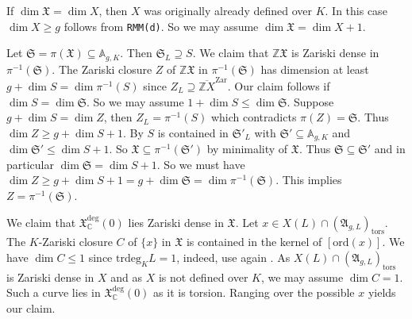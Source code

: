 \documentclass[12pt,oneside]{amsart}
\numberwithin{maincounter}{section}
\numberwithin{equation}{section}
\def\AA{\mathbb{A}}
\def\CC{\mathbb{C}}
\def\ZZ{\mathbb{Z}}
\newcommand{\cal}{\mathcal}
\newcommand{\cA}{\cal{A}}
\newcommand{\IC}{{\CC}}
\newcommand{\IZ}{{\ZZ}}
\newcommand{\IA}{{\AA}}
\renewcommand{\subset}{\subseteq} %
\renewcommand{\supset}{\supseteq}
\begin{document}
If $\dim \mathfrak X =\dim X$, then $X$ was originally already
defined over $K$. In this case $\dim X\ge g$ follows from \texttt{RMM(d)}.
So we may assume $\dim \mathfrak X = \dim X + 1$. 

Let $\mathfrak S = \pi(\mathfrak X)\subset\IA_{g,K}$.
Then $\mathfrak{S}_L\supset S$.
We claim that $\IZ \mathfrak X$ is Zariski dense in
$\pi^{-1}(\mathfrak S)$.
The Zariski closure $Z$ of $\IZ \mathfrak X$ in
$\pi^{-1}(\mathfrak S)$ %
has dimension at least
$g+\dim S = \dim \pi^{-1}(S)$ since $Z_L\supset \overline{\IZ
  X}^{\mathrm{Zar}}$.
Our claim follows if $\dim S =
\dim\mathfrak{S}$.  So we may assume $1+\dim S \le  \dim \mathfrak S$.
Suppose $g+\dim S = \dim Z$, then  $Z_L= \pi^{-1}(S)$
which contradicts $ \pi(Z)=\mathfrak{S}$.
 Thus $\dim Z\ge g + \dim S + 1$.
By \cite[Lemma~2.2]{BarDill} $S$ is contained in $\mathfrak{S}'_L$
with $\mathfrak{S}'\subset\IA_{g,K}$ and $\dim \mathfrak{S}' \le \dim
S + 1$. So $\mathfrak{X} \subset\pi^{-1}(\mathfrak S')$ by minimality
of $\mathfrak{X}$. Thus $\mathfrak S \subset \mathfrak S'$ and in
particular $\dim \mathfrak{S} = \dim S + 1$.
So we must have $\dim Z \ge
g+\dim S + 1 = g+\dim\mathfrak S = \dim \pi^{-1}(\mathfrak S)$. This
implies $Z=\pi^{-1}(\mathfrak S)$.

We claim that $\mathfrak{X}_\IC^{\mathrm{deg}}(0)$ lies Zariski dense
in $\mathfrak{X}$.
Let $x \in X(L) \cap (\mathfrak{A}_{g,L})_{\mathrm{tors}}$.
The $K$-Zariski closure $C$ of $\{x\}$ in $\mathfrak{X}$ is contained in the kernel of
$[\mathrm{ord}(x)]$.
We have $\dim C\le 1$ since $\mathrm{trdeg}_K L = 1$, indeed, use
again \cite[Lemma~2.2]{BarDill}. As 
$X(L) \cap (\mathfrak{A}_{g,L})_{\mathrm{tors}}$ is Zariski dense in
$X$ and as $X$ is not defined over $K$, we may assume $\dim C = 1$. 
Such a curve lies in $\mathfrak{X}_\IC^{\mathrm{deg}}(0)$ as it is torsion. Ranging
over the possible $x$ yields our claim.
\end{document}
